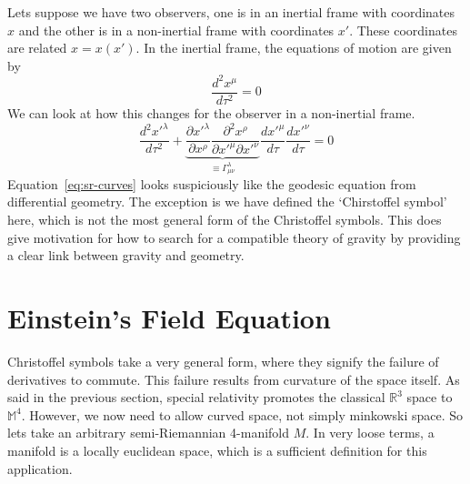 Lets suppose we have two observers, one is in an inertial frame with coordinates $x$ and the other is in a non-inertial frame with coordinates $x'$. These coordinates are related $x = x(x')$. In the inertial frame, the equations of motion are given by 
\begin{equation}
    \frac{d^2x^\mu}{d\tau^2} = 0
\end{equation} 
We can look at how this changes for the observer in a non-inertial frame.
\begin{equation}\label{eq:sr-curves}
    \frac{d^2x'^\lambda}{d\tau^2}+\underbrace{\frac{\partial x'^\lambda}{\partial x^\rho}\frac{\partial^2 x^\rho}{\partial x'^\mu \partial x'^\nu}}_{\equiv \Gamma_{\mu\nu}^\lambda} \frac{d x'^\mu}{d \tau} \frac{d x'^\nu}{d \tau} = 0
\end{equation}
Equation~\ref{eq:sr-curves} looks suspiciously like the geodesic equation from differential geometry. The exception is we have defined the `Chirstoffel symbol' here, which is not the most general form of the Christoffel symbols. This does give motivation for how to search for a compatible theory of gravity by providing a clear link between gravity and geometry. 
\section{Einstein's Field Equation}
Christoffel symbols take a very general form, where they signify the failure of derivatives to commute. This failure results from curvature of the space itself. As said in the previous section, special relativity promotes the classical $\mathbb{R}^3$ space to $\mathbb{M}^4$. However, we now need to allow curved space, not simply minkowski space. So lets take an arbitrary semi-Riemannian 4-manifold $M$. In very loose terms, a manifold is a locally euclidean space, which is a sufficient definition for this application.

